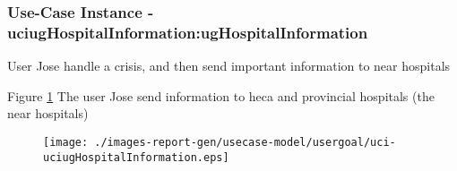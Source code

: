 
	\subsubsection{Use-Case Instance - uciugHospitalInformation:ugHospitalInformation}
	
	User Jose handle a crisis, and then send important information to near hospitals		  
	\begin{operationmodel}
	
	\end{operationmodel} 

	
	Figure \ref{fig:lu.uni.lassy.excalibur.examples.icrash-RE-UC-uci-uciugHospitalInformation}
	The user Jose send information to heca and provincial hospitals (the near hospitals)
	
	\begin{figure}[htbp]
	\begin{center}
	
	\texttt{[image: ./images-report-gen/usecase-model/usergoal/uci-uciugHospitalInformation.eps]}
	\end{center}
	\caption[lu.uni.lassy.excalibur.examples.icrash Sequence Diagram: uci-uciugHospitalInformation]{}
	\label{fig:lu.uni.lassy.excalibur.examples.icrash-RE-UC-uci-uciugHospitalInformation}
	\end{figure}
	\vspace{0.5cm}
